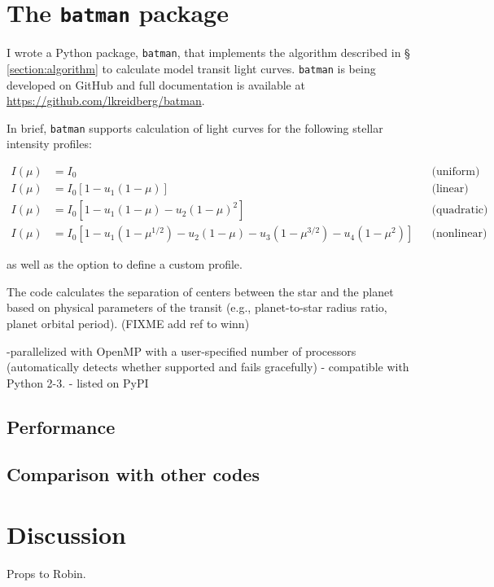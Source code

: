 \documentclass[12pt,preprint]{aastex}
\newcommand*{\blue}{\textcolor{blue}}
\begin{document}
\section{The \texttt{batman} package}
I wrote a Python package, \texttt{batman}, that implements the algorithm described in \S\,\ref{section:algorithm} to calculate model transit light curves. \texttt{batman} is being developed on GitHub and full documentation is available at \blue{\url{https://github.com/lkreidberg/batman}}.

In brief, \texttt{batman} supports calculation of light curves for the following stellar intensity profiles:

\begin{align}
  I(\mu) &= I_0                                                                         & &\text{(uniform)}             \\
  I(\mu) &= I_0[1 - u_1(1-\mu)]                                                         & &\text{(linear)}              \\
  I(\mu) &= I_0[1 - u_1(1 - \mu) - u_2(1-\mu)^2]                                        & &\text{(quadratic)}           \\
  I(\mu) &= I_0[1 - u_1(1-\mu^{1/2}) - u_2(1- \mu) - u_3(1-\mu^{3/2}) - u_4(1-\mu^2)]   & &\text{(nonlinear)}
\end{align}

as well as the option to define a custom profile.

The code calculates the separation of centers between the star and the planet based on physical parameters of the transit (e.g., planet-to-star radius ratio, planet orbital period). (FIXME add ref to winn)

-parallelized with OpenMP with a user-specified number of processors (automatically detects whether supported and fails gracefully)
- compatible with Python 2-3.
- listed on PyPI


\subsection{Performance}
\subsection{Comparison with other codes}

\section{Discussion}

\acknowledgments
Props to Robin.



\end{document}
